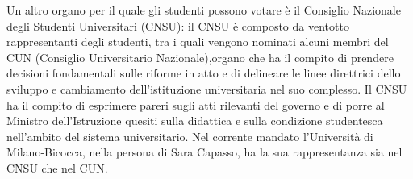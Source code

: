 Un altro organo per il quale gli studenti possono votare è il Consiglio Nazionale degli Studenti Universitari (CNSU): il CNSU è composto da ventotto rappresentanti degli studenti, tra i quali vengono nominati alcuni membri del CUN (Consiglio Universitario Nazionale),organo che ha il compito di prendere decisioni fondamentali sulle riforme in atto e di delineare le linee direttrici dello sviluppo e cambiamento dell'istituzione universitaria nel suo complesso. Il CNSU ha il compito di esprimere pareri sugli atti rilevanti del governo e di porre al Ministro dell'Istruzione quesiti sulla didattica e  sulla condizione studentesca nell'ambito del sistema universitario. Nel corrente mandato l’Università di Milano-Bicocca, nella persona di Sara Capasso, ha la sua rappresentanza sia nel CNSU che nel CUN. 
